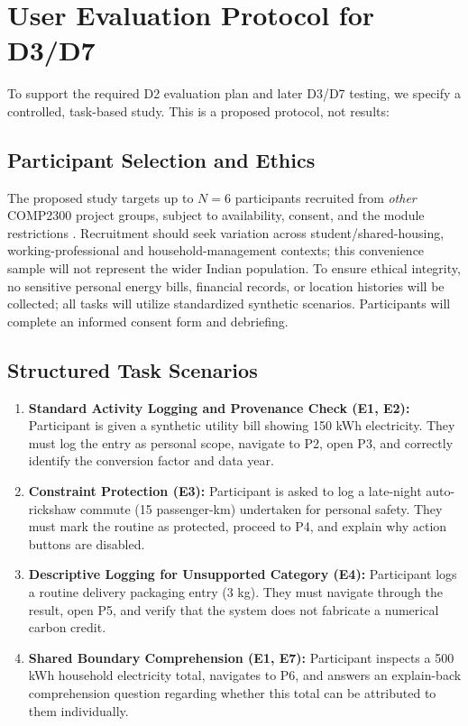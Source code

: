 \documentclass[12pt,a4paper]{article}
\begin{document}
\section{User Evaluation Protocol for D3/D7}

To support the required D2 evaluation plan and later D3/D7 testing, we specify a controlled, task-based study. This is a proposed protocol, not results:

\subsection{Participant Selection and Ethics}
The proposed study targets up to $N=6$ participants recruited from \emph{other} COMP2300 project groups, subject to availability, consent, and the module restrictions \cite{modulebrief}. Recruitment should seek variation across student/shared-housing, working-professional and household-management contexts; this convenience sample will not represent the wider Indian population. To ensure ethical integrity, no sensitive personal energy bills, financial records, or location histories will be collected; all tasks will utilize standardized synthetic scenarios. Participants will complete an informed consent form and debriefing.

\subsection{Structured Task Scenarios}
\begin{enumerate}[label=\textbf{Task \arabic*:},leftmargin=*]
  \item \textbf{Standard Activity Logging and Provenance Check (E1, E2):} Participant is given a synthetic utility bill showing 150 kWh electricity. They must log the entry as personal scope, navigate to P2, open P3, and correctly identify the conversion factor and data year.
  \item \textbf{Constraint Protection (E3):} Participant is asked to log a late-night auto-rickshaw commute (15 passenger-km) undertaken for personal safety. They must mark the routine as protected, proceed to P4, and explain why action buttons are disabled.
  \item \textbf{Descriptive Logging for Unsupported Category (E4):} Participant logs a routine delivery packaging entry (3 kg). They must navigate through the result, open P5, and verify that the system does not fabricate a numerical carbon credit.
  \item \textbf{Shared Boundary Comprehension (E1, E7):} Participant inspects a 500 kWh household electricity total, navigates to P6, and answers an explain-back comprehension question regarding whether this total can be attributed to them individually.
\end{enumerate}
\end{document}
